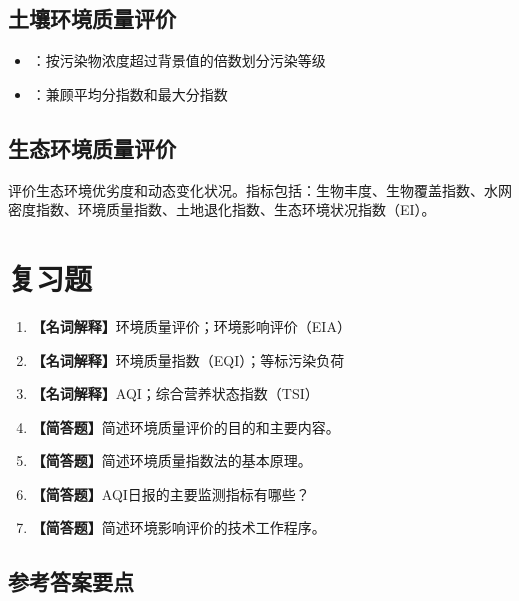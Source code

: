 \subsection{土壤环境质量评价}
\begin{itemize}[leftmargin=*]
    \item {}：按污染物浓度超过背景值的倍数划分污染等级
    \item {}：兼顾平均分指数和最大分指数
\end{itemize}

\subsection{生态环境质量评价}
评价生态环境优劣度和动态变化状况。指标包括：生物丰度、生物覆盖指数、水网密度指数、环境质量指数、土地退化指数、生态环境状况指数（EI）。

\section{复习题}

\begin{enumerate}[leftmargin=*, itemsep=8pt]
    \item \textbf{【名词解释】}环境质量评价；环境影响评价（EIA）
    \item \textbf{【名词解释】}环境质量指数（EQI）；等标污染负荷
    \item \textbf{【名词解释】}AQI；综合营养状态指数（TSI）
    \item \textbf{【简答题】}简述环境质量评价的目的和主要内容。
    \item \textbf{【简答题】}简述环境质量指数法的基本原理。
    \item \textbf{【简答题】}AQI日报的主要监测指标有哪些？
    \item \textbf{【简答题】}简述环境影响评价的技术工作程序。
\end{enumerate}

\subsection*{参考答案要点}

